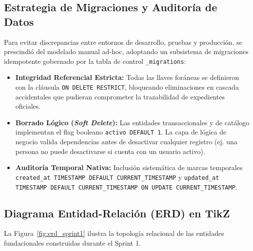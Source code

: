 \documentclass[a4paper,12pt]{article}
\begin{document}
\subsection{Estrategia de Migraciones y Auditoría de Datos}
Para evitar discrepancias entre entornos de desarrollo, pruebas y producción, se prescindió del modelado manual ad-hoc, adoptando un subsistema de migraciones idempotente gobernado por la tabla de control \texttt{\_migrations}:
\begin{itemize}[leftmargin=1.5em]
    \item \textbf{Integridad Referencial Estricta:} Todas las llaves foráneas se definieron con la cláusula \texttt{ON DELETE RESTRICT}, bloqueando eliminaciones en cascada accidentales que pudieran comprometer la trazabilidad de expedientes oficiales.
    \item \textbf{Borrado Lógico (\emph{Soft Delete}):} Las entidades transaccionales y de catálogo implementan el flag booleano \texttt{activo DEFAULT 1}. La capa de lógica de negocio valida dependencias antes de desactivar cualquier registro (ej. una persona no puede desactivarse si cuenta con un usuario activo).
    \item {\raggedright\textbf{Auditoría Temporal Nativa:} Inclusión sistemática de marcas temporales \texttt{created\_at TIMESTAMP DEFAULT CURRENT\_\allowbreak TIMESTAMP} y \texttt{updated\_at TIMESTAMP DEFAULT CURRENT\_\allowbreak TIMESTAMP ON UPDATE CURRENT\_\allowbreak TIMESTAMP}.\par}
\end{itemize}

\subsection{Diagrama Entidad-Relación (ERD) en TikZ}
La Figura~\ref{fig:erd_sprint1} ilustra la topología relacional de las entidades fundacionales construidas durante el Sprint 1.
\end{document}

